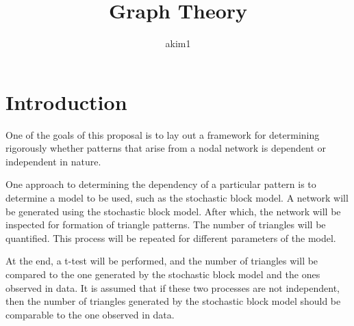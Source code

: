 \documentclass{article}
\title{Graph Theory}
\author{akim1}
\begin{document}
\maketitle
\section{Introduction}
One of the goals of this proposal is to lay out a framework for determining
rigorously whether patterns that arise from a nodal network is dependent or
independent in nature.

One approach to determining the dependency of a particular pattern is to
determine a model to be used, such as the stochastic block model. A network
will be generated using the stochastic block model. After which, the network
will be inspected for formation of triangle patterns. The number of triangles
will be quantified. This process will be repeated for different parameters of
the model.

At the end, a t-test will be performed, and the number of triangles will be
compared to the one generated by the stochastic block model and the ones
observed in data. It is assumed that if these two processes are not independent,
then the number of triangles generated by the stochastic block model should be
comparable to the one observed in data.
\end{document}
